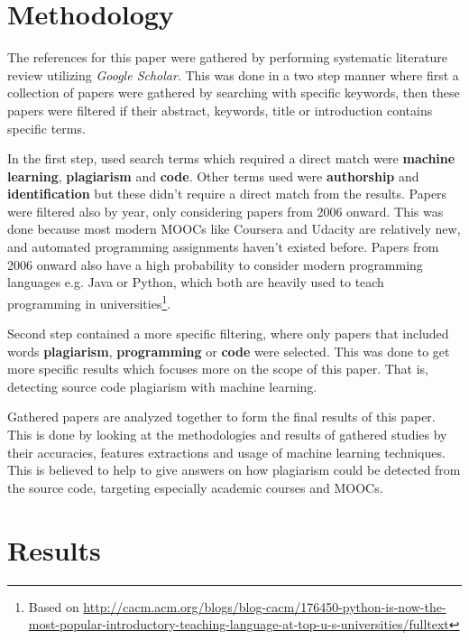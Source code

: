 \documentclass[english]{tktltiki2}
\theoremstyle{definition}
\theoremstyle{remark}
\begin{document}
\section{Methodology}


The references for this paper were gathered by performing systematic literature review utilizing \textit{Google Scholar}. This was done in a two step manner where first a collection of papers were gathered by searching with specific keywords, then these papers were filtered if their abstract, keywords, title or introduction contains specific terms. 

In the first step, used search terms which required a direct match were \textbf{machine learning}, \textbf{plagiarism} and \textbf{code}. Other terms used were \textbf{authorship} and \textbf{identification} but these didn't require a direct match from the results. Papers were filtered also by year, only considering papers from 2006 onward. This was done because most modern MOOCs like Coursera and Udacity are relatively new, and automated programming assignments haven't existed before. Papers from 2006 onward also have a high probability to consider modern programming languages e.g. Java or Python, which both are heavily used to teach programming in universities\footnote{Based on \url{http://cacm.acm.org/blogs/blog-cacm/176450-python-is-now-the-most-popular-introductory-teaching-language-at-top-u-s-universities/fulltext}}. 

Second step contained a more specific filtering, where only papers that included words \textbf{plagiarism}, \textbf{programming} or \textbf{code} were selected. This was done to get more specific results which focuses more on the scope of this paper. That is, detecting source code plagiarism with machine learning. 

Gathered papers are analyzed together to form the final results of this paper. This is done by looking at the methodologies and results of gathered studies by their accuracies, features extractions and usage of machine learning techniques. This is believed to help to give answers on how plagiarism could be detected from the source code, targeting especially academic courses and MOOCs.


\section{Results}
\end{document}
